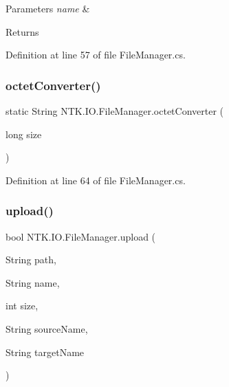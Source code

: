 \begin{DoxyParams}{Parameters}
{\em name} & \\
\hline
\end{DoxyParams}
\begin{DoxyReturn}{Returns}

\end{DoxyReturn}


Definition at line 57 of file File\+Manager.\+cs.

\mbox{\label{class_n_t_k_1_1_i_o_1_1_file_manager_ad899a9fcab668809680cc1c61554c79e}} 
\subsubsection{\texorpdfstring{octetConverter()}{octetConverter()}}
{\footnotesize\ttfamily static String N\+T\+K.\+I\+O.\+File\+Manager.\+octet\+Converter (\begin{DoxyParamCaption}\item[{long}]{size }\end{DoxyParamCaption})\hspace{0.3cm}{\ttfamily [static]}}



Definition at line 64 of file File\+Manager.\+cs.

\mbox{\label{class_n_t_k_1_1_i_o_1_1_file_manager_a95add86067921b318f9c5c9704ee32d2}} 
\subsubsection{\texorpdfstring{upload()}{upload()}}
{\footnotesize\ttfamily bool N\+T\+K.\+I\+O.\+File\+Manager.\+upload (\begin{DoxyParamCaption}\item[{String}]{path,  }\item[{String}]{name,  }\item[{int}]{size,  }\item[{String}]{source\+Name,  }\item[{String}]{target\+Name }\end{DoxyParamCaption})}






